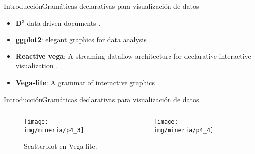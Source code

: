 \documentclass[10pt]{beamer}
\newcommand{\1}{
	\setbeamertemplate{background}{
		\texttt{[image: img/1]}
		\tikz[overlay] \fill[fill opacity=0.75,fill=white] (0,0) rectangle (-\paperwidth,\paperheight);
	}
}
\begin{document}
\begin{frame}{Introducción}{Gramáticas declarativas para visualización de datos}

\begin{itemize}
	\item\textbf{D$^3$} data-driven documents \cite{bostock2011d3}.
	\item \textbf{ggplot2}: elegant graphics for data analysis \cite{wickham2016ggplot2}.
	\item \textbf{Reactive vega}: A streaming dataflow architecture for declarative interactive visualization \cite{satyanarayan2015reactive}.
	\item \textbf{Vega-lite}: A grammar of interactive graphics \cite{satyanarayan2016vega}.
	
\end{itemize}

\end{frame}

\begin{frame}{Introducción}{Gramáticas declarativas para visualización de datos}
\begin{columns}
	\begin{column}{0.48\textwidth}
		\begin{figure}[]
			\centering
			\texttt{[image: img/mineria/p4\_3]}
			\caption{Scatterplot en Vega-lite.}
		\end{figure}	
	\end{column}
	\begin{column}{0.48\textwidth}
		\begin{figure}[]
			\centering
			\texttt{[image: img/mineria/p4\_4]}
		\end{figure}	
	\end{column}
\end{columns}
\end{frame}
\end{document}
